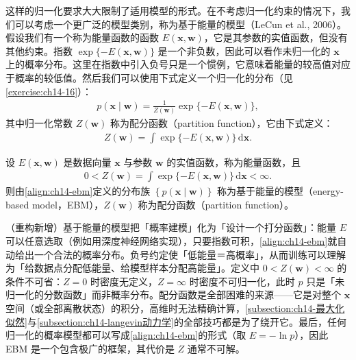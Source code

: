 \documentclass[../../main.tex]{subfiles}
\begin{document}
这样的归一化要求大大限制了适用模型的形式。在不考虑归一化约束的情况下，我们可以考虑一个更广泛的模型类别，称为基于能量的模型（LeCun et al., 2006）。假设我们有一个称为能量函数的函数 $E(\bm{x},\bm{w})$，它是其参数的实值函数，但没有其他约束。指数 $\exp\{-E(\bm{x},\bm{w})\}$ 是一个非负数，因此可以看作未归一化的 $\bm{x}$ 上的概率分布。这里在指数中引入负号只是一个惯例，它意味着能量的较高值对应于概率的较低值。然后我们可以使用下式定义一个归一化的分布（见\cref{exercise:ch14-16}）：
\begin{align}
p(\bm{x}\mid\bm{w})=\frac{1}{Z(\bm{w})}\exp\{-E(\bm{x},\bm{w})\},
\label{align:ch14-ebm}
\end{align}
其中归一化常数 $Z(\bm{w})$ 称为配分函数（partition function），它由下式定义：
\begin{align}
Z(\bm{w})=\int\exp\{-E(\bm{x},\bm{w})\}\,\mathrm{d}\bm{x}.
\label{align:ch14-partition}
\end{align}

\begin{definition}[基于能量的模型]\label{definition:ch14-基于能量模型}
设 $E(\bm{x},\bm{w})$ 是数据向量 $\bm{x}$ 与参数 $\bm{w}$ 的实值函数，称为能量函数，且
\begin{align*}
0<Z(\bm{w})=\int\exp\{-E(\bm{x},\bm{w})\}\,\mathrm{d}\bm{x}<\infty.
\end{align*}
则由\eqref{align:ch14-ebm}定义的分布族 $\left\{p(\bm{x}\mid\bm{w})\right\}$ 称为基于能量的模型（energy-based model，EBM），$Z(\bm{w})$ 称为配分函数（partition function）。
\end{definition}

\begin{remark}（重构新增）基于能量的模型把「概率建模」化为「设计一个打分函数」：能量 $E$ 可以任意选取（例如用深度神经网络实现），只要指数可积，\eqref{align:ch14-ebm}就自动给出一个合法的概率分布。负号约定使「低能量＝高概率」，从而训练可以理解为「给数据点分配低能量、给模型样本分配高能量」。定义中 $0<Z(\bm{w})<\infty$ 的条件不可省：$Z=0$ 时密度无定义，$Z=\infty$ 时密度不可归一化，此时 $p$ 只是「未归一化的分数函数」而非概率分布。配分函数是全部困难的来源——它是对整个 $\bm{x}$ 空间（或全部离散状态）的积分，高维时无法精确计算，\cref{subsection:ch14-最大化似然}与\cref{subsection:ch14-langevin动力学}的全部技巧都是为了绕开它。最后，任何归一化的概率模型都可以写成\eqref{align:ch14-ebm}的形式（取 $E=-\ln p$），因此 EBM 是一个包含极广的框架，其代价是 $Z$ 通常不可解。
\end{remark}
\end{document}
